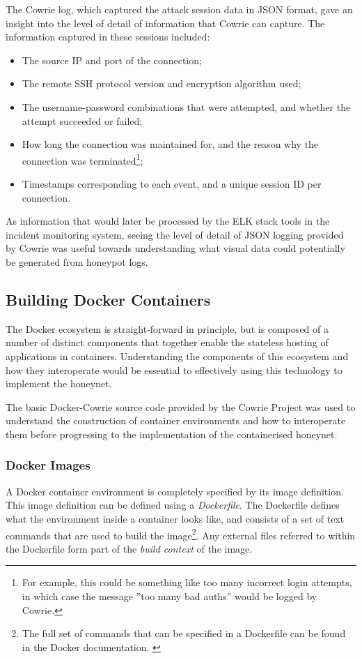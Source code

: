 The Cowrie log, which captured the attack session data in JSON format, gave an insight into the level of detail of information that Cowrie can capture. The information captured in these sessions included:

\begin{itemize}
\item The source IP and port of the connection;
\item The remote SSH protocol version and encryption algorithm used;
\item The username-password combinations that were attempted, and whether the attempt succeeded or failed;
\item How long the connection was maintained for, and the reason why the connection was terminated\footnote{For example, this could be something like too many incorrect login attempts, in which case the message ''too many bad auths'' would be logged by Cowrie.};
\item Timestamps corresponding to each event, and a unique session ID per connection.
\end{itemize}

As information that would later be processed by the ELK stack tools in the incident monitoring system, seeing the level of detail of JSON logging provided by Cowrie was useful towards understanding what visual data could potentially be generated from honeypot logs.

%
%

\subsection{Building Docker Containers}
The Docker ecosystem is straight-forward in principle, but is composed of a number of distinct components that together enable the stateless hosting of applications in containers. Understanding the components of this ecosystem and how they interoperate would be essential to effectively using this technology to implement the honeynet.

The basic Docker-Cowrie source code provided by the Cowrie Project \cite{DockerCowrie} was used to understand the construction of container environments and how to interoperate them before progressing to the implementation of the containerised honeynet.

\subsubsection{Docker Images}
A Docker container environment is completely specified by its image definition. This image definition can be defined using a \textit{Dockerfile}. The Dockerfile defines what the environment inside a container looks like, and consists of a set of text commands that are used to build the image\footnote{The full set of commands that can be specified in a Dockerfile can be found in the Docker documentation. \cite{AllCommandsForDockerfiles}}. Any external files referred to within the Dockerfile form part of the \textit{build context} of the image.

